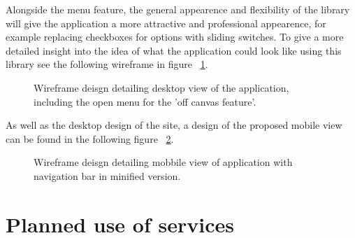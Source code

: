 Alongside the menu feature, the general appearence and flexibility of the library will give the application a more attractive and professional appearence, for example replacing checkboxes for options with sliding switches. To give a more detailed insight into the idea of what the application could look like using this library see the following wireframe in figure ~\ref{fig:wiredesktop}.

\begin{figure}[h!]
  \centering
  \caption{Wireframe deisgn detailing desktop view of the application, including the open menu for the 'off canvas feature'.}
  \label{fig:wiredesktop}
\end{figure}

As well as the desktop design of the site, a design of the proposed mobile view can be found in the following figure ~\ref{fig:wiremobile}.

\begin{figure}[h!]
  \centering
  \caption{Wireframe deisgn detailing mobbile view of application with navigation bar in minified version.}
  \label{fig:wiremobile}
\end{figure}


\section{Planned use of services}

